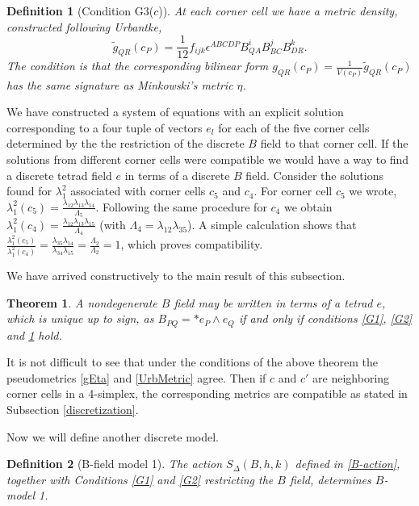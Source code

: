 \documentclass{article}
\newtheorem{theorem}{Theorem}
\newtheorem{definition}{Definition}
\begin{document}
\begin{definition}[Condition G3($c$)]\label{G3}
	At each corner cell we have a metric density, constructed following Urbantke, 
\begin{equation}\label{UrbMetric}
	\tilde{g}_{QR}(c_{P}) =  
	\frac{1}{12}f_{ijk} \epsilon^{ABCDP} B^i_{QA} B^j_{BC} B^k_{DR} . 
\end{equation}
The condition is that the corresponding bilinear form 
$g_{QR}(c_{P}) = \frac{1}{V(c_{P})} \tilde{g}_{QR}(c_{P})$ has the same signature as Minkowski's metric $\eta$. 
\end{definition}

We have constructed a system of equations with an explicit solution corresponding to a four tuple of vectors $e_l$ for each of the five corner cells determined by the the restriction of the discrete $B$ field to that corner cell. 
If the solutions from different corner cells were compatible we would have a way to find a discrete tetrad field $e$ in terms of a discrete $B$ field. 
Consider the solutions found for $\lambda_1^2$ associated with corner cells $c_5$ and $c_4$. 
For corner cell $c_5$ we wrote, 
$\lambda_1^2(c_5) = \frac{\lambda_{12} \lambda_{13} \lambda_{14}}{\Lambda_5}$. 
Following the same procedure for $c_4$ we obtain 
$\lambda_1^2(c_4) = \frac{\lambda_{12} \lambda_{13} \lambda_{15}}{\Lambda_4}$ (with $\Lambda_4 = \lambda_{12} \lambda_{35}$). 
A simple calculation shows that 
$\frac{\lambda_1^2(c_5)}{\lambda_1^2(c_4)}= \frac{\lambda_{35}\lambda_{14}}{\lambda_{34}\lambda_{15}} = \frac{\Lambda_2}{\Lambda_2}=1$, which proves compatibility. 

We have arrived constructively to the main result of this subsection. 
\begin{theorem}\label{Thm1}
	A nondegenerate $B$ field may be written in terms of a tetrad $e$, which is unique up to sign, as 
	$B_{PQ} = \ast e_P \wedge e_Q$ 
	if and only if conditions \ref{G1}, \ref{G2} and \ref{G3} hold. 
\end{theorem}

It is not difficult to see that under the conditions of the above theorem the pseudometrics \eqref{gEta} and \eqref{UrbMetric} agree. Then if $c$ and $c'$ are neighboring corner cells in a 4-simplex, the corresponding metrics are compatible as stated in Subsection \ref{discretization}. 

Now we will define another discrete model. 
\begin{definition}[B-field model 1]
	The action $S_{\Delta}(B, h, k)$ defined in \eqref{B-action}, together with Conditions \ref{G1} and \ref{G2} restricting the $B$ field, determines $B$-model 1. 
\end{definition}
\end{document}

